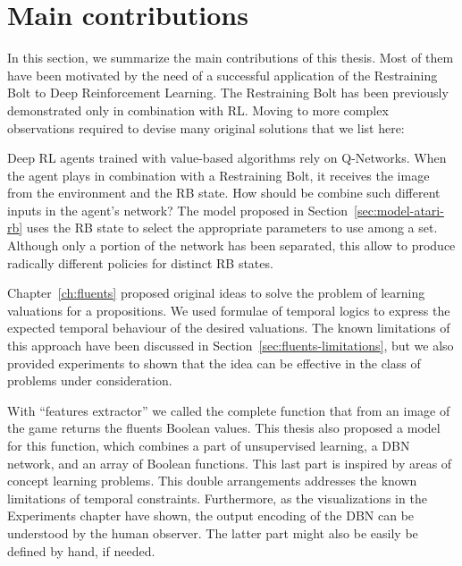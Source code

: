 \section{Main contributions}

In this section, we summarize the main contributions of this thesis. Most of
them have been motivated by the need of a successful application of the
Restraining Bolt to Deep Reinforcement Learning. The Restraining Bolt has been
previously demonstrated only in combination with RL. Moving to more complex
observations required to devise many original solutions that we list here:

\begin{description}[style=nextline]
	
	\item[Model for a deep restrained agent]
		Deep RL agents trained with value-based algorithms rely on Q-Networks.
		When the agent plays in combination with a Restraining Bolt, it receives
		the image from the environment and the RB state. How should be combine
		such different inputs in the agent's network? The model proposed in
		Section~\ref{sec:model-atari-rb} uses the RB state to select the
		appropriate parameters to use among a set. Although only a portion of the
		network has been separated, this allow to produce radically different
		policies for distinct RB states.

	\item[Learning fluents with temporal constraints]
		Chapter~\ref{ch:fluents} proposed original ideas to solve the problem of
		learning valuations for a propositions. We used formulae of temporal
		logics to express the expected temporal behaviour of the desired
		valuations. The known limitations of this approach have been discussed in
		Section~\ref{sec:fluents-limitations}, but we also provided experiments to
		shown that the idea can be effective in the class of problems under
		consideration.

	\item[Models for the features extractor]
		With ``features extractor'' we called the complete function that from an
		image of the game returns the fluents Boolean values. This thesis also
		proposed a model for this function, which combines a part of unsupervised
		learning, a DBN network, and an array of Boolean functions. This last part
		is inspired by areas of concept learning problems. This double
		arrangements addresses the known limitations of temporal constraints.
		Furthermore, as the visualizations in the Experiments chapter have shown,
		the output encoding of the DBN can be understood by the human observer.
		The latter part might also be easily be defined by hand, if needed.


\end{description}
